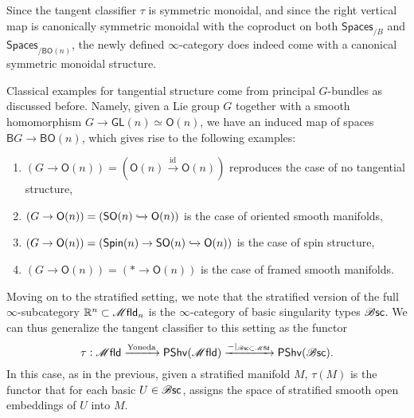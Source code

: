 \documentclass[../text]{subfiles}
\begin{document}
\begin{remark}
    Since the tangent classifier $\tau$ is symmetric monoidal, and since the right vertical map is canonically symmetric monoidal with the coproduct on both $\mathsf{Spaces}_{/B}$ and $\mathsf{Spaces}_{/\mathsf{BO}(n)}$, the newly defined $\infty$-category does indeed come with a canonical symmetric monoidal structure.
\end{remark}

\begin{example}
    Classical examples for tangential structure come from principal $G$-bundles as discussed before. Namely, given a Lie group $G$ together with a smooth homomorphism $G \rightarrow \mathsf{GL}(n) \simeq \mathsf{O}(n)$, we have an induced map of spaces $\mathsf{B}G \rightarrow \mathsf{BO}(n)$, which gives rise to the following examples:
    \begin{enumerate}
        \item $(G \rightarrow \mathsf{O}(n)) = (\mathsf{O}(n) \xrightarrow{\mathrm{id}} \mathsf{O}(n))$ reproduces the case of no tangential structure,
        \item $(G \rightarrow \mathsf{O}(n)) = (\mathsf{SO}(n) \xhookrightarrow{} \mathsf{O}(n))$ is the case of oriented smooth manifolds,
        \item $(G \rightarrow \mathsf{O}(n)) = (\mathsf{Spin}(n) \rightarrow \mathsf{SO}(n) \xhookrightarrow{} \mathsf{O}(n))$ is the case of spin structure,
        \item $(G \rightarrow \mathsf{O}(n)) = (* \rightarrow \mathsf{O}(n))$ is the case of framed smooth manifolds.
    \end{enumerate}
\end{example}

Moving on to the stratified setting, we note that the stratified version of the full $\infty$-subcategory $\mathbb{R}^n \subset \mfld_n$ is the $\infty$-category of basic singularity types $\mathscr{B} \mathsf{sc}$. We can thus generalize the tangent classifier to this setting as the functor
%
\begin{equation}
    \tau: \mfld \xrightarrow{\mathrm{Yoneda}} \mathsf{PShv}(\mfld) \xrightarrow{-|_{\bsc \subset \mfld}} \mathsf{PShv}(\bsc).
\end{equation}
%
In this case, as in the previous, given a stratified manifold $M$, $\tau(M)$ is the functor that for each basic $U \in \mathscr{B} \mathsf{sc}$, assigns the space of stratified smooth open embeddings of $U$ into $M$.
\end{document}
